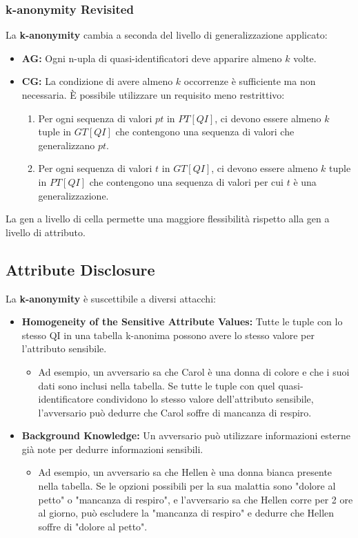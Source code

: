 \documentclass{report}
\begin{document}
\subsubsection{k-anonymity Revisited}
La \textbf{k-anonymity} cambia a seconda del livello di generalizzazione applicato:

\begin{itemize}
    \item \textbf{AG:} Ogni n-upla di quasi-identificatori deve apparire almeno $k$ volte.
    \item \textbf{CG:} La condizione di avere almeno $k$ occorrenze è sufficiente ma non necessaria. È possibile utilizzare un requisito meno restrittivo:
    \begin{enumerate}
        \item Per ogni sequenza di valori $pt$ in $\mathit{PT[QI]}$, ci devono essere almeno $k$ tuple in $\mathit{GT[QI]}$ che contengono una sequenza di valori che generalizzano $pt$.
        \item Per ogni sequenza di valori $t$ in $\mathit{GT[QI]}$, ci devono essere almeno $k$ tuple in $\mathit{PT[QI]}$ che contengono una sequenza di valori per cui $t$ è una generalizzazione.
    \end{enumerate}
\end{itemize}

\noindent La gen a livello di cella permette una maggiore flessibilità rispetto alla gen a livello di attributo.


\subsection{Attribute Disclosure}
La \textbf{k-anonymity} è suscettibile a diversi attacchi:

\begin{itemize}
    \item \textbf{Homogeneity of the Sensitive Attribute Values:} 
    Tutte le tuple con lo stesso QI in una tabella k-anonima possono avere lo stesso valore per l'attributo sensibile.
    \begin{itemize}
        \item Ad esempio, un avversario sa che Carol è una donna di colore e che i suoi dati sono inclusi nella tabella. Se tutte le tuple con quel quasi-identificatore condividono lo stesso valore dell'attributo sensibile, l'avversario può dedurre che Carol soffre di mancanza di respiro.
    \end{itemize}
    
    \item \textbf{Background Knowledge:} 
    Un avversario può utilizzare informazioni esterne già note per dedurre informazioni sensibili.
    \begin{itemize}
        \item Ad esempio, un avversario sa che Hellen è una donna bianca presente nella tabella. Se le opzioni possibili per la sua malattia sono "dolore al petto" o "mancanza di respiro", e l'avversario sa che Hellen corre per 2 ore al giorno, può escludere la "mancanza di respiro" e dedurre che Hellen soffre di "dolore al petto".
    \end{itemize}
\end{itemize}
\end{document}
